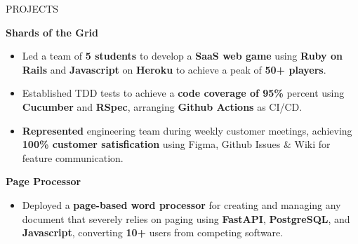 \documentclass{resume} %
\begin{document}
\begin{rSection}{PROJECTS}
\vspace{-1.25em}
\item \textbf{Shards of the Grid} 
\begin{itemize}
   \itemsep -3pt {} 
   \item Led a team of \textbf{5 students} to develop a \textbf{SaaS web game} using \textbf{Ruby on Rails} and \textbf{Javascript} on \textbf{Heroku} to achieve a peak of \textbf{50+ players}.
   \item Established TDD tests to achieve a \textbf{code coverage of 95\%} percent using \textbf{Cucumber} and \textbf{RSpec}, arranging \textbf{Github Actions} as CI/CD.
   \item \textbf{Represented} engineering team during weekly customer meetings, achieving \textbf{100\% customer satisfication} using Figma, Github Issues \& Wiki for feature communication.
\end{itemize}

\item \textbf{Page Processor} 
\begin{itemize}
   \itemsep -3pt {} 
     \item Deployed a \textbf{page-based word processor} for creating and managing any document that severely relies on paging using \textbf{FastAPI}, \textbf{PostgreSQL}, and \textbf{Javascript}, converting \textbf{10+} users from competing software.
\end{itemize}
\end{rSection} 


       
\end{document}
